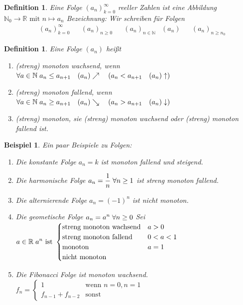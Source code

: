 \documentclass[a4paper,titlepage,oneside]{article}
\def\N{\ensuremath{\mathbb{N}} }
\def\R{\ensuremath{\mathbb{R}} }
\def\fa{\ensuremath{\forall}}
\def\sp{\hspace{0,1cm}}
\theoremstyle{thmstyle}
\newtheorem{defi}[satz]{Definition}
\newtheorem{bsp}[satz]{Beispiel}
\theoremstyle{subthmstyle}
\begin{document}
\begin{defi}
Eine Folge $(a_n)_{k=0}^{\infty}$ reeller Zahlen ist eine Abbildung $\N_0 \rightarrow \R\text{ mit } n \mapsto a_n$
Bezeichnung: Wir schreiben für Folgen
\begin{align*}
&(a_n)_{k=0}^{\infty} && (a_n)_{n\ge0} && (a_n)_{n\in\N} & (a_n) && (a_n)_{n\ge n_0}
\end{align*}
\end{defi}


\begin{defi}
Eine Folge \((a_n)\) heißt
\begin{enumerate}
\item (streng) monoton wachsend, wenn \( \fa a \in \N \sp a_n \le a_{n+1}	\quad (a_n)\nearrow	\quad (a_n < a_{n+1} \quad (a_n)\uparrow)\)
\item (streng) monoton fallend, wenn \( \fa a \in \N \sp a_n \ge a_{n+1}	\quad (a_n)\searrow	\quad (a_n > a_{n+1} \quad (a_n)\downarrow)\)
\item (streng) monoton, sie (streng) monoton wachsend oder (streng) monoton fallend ist.
\end{enumerate}
\end{defi}

\begin{bsp}
Ein paar Beispiele zu Folgen:
\begin{enumerate}[label=(\arabic*)]
\item Die konstante Folge \(a_n = k\) ist monoton fallend und steigend.
\item Die harmonische Folge $ \displaystyle a_n = \frac{1}{n} \sp \fa n \ge 1$ ist streng monoton fallend.
\item Die alternierende Folge $ \displaystyle a_n = (-1)^n $ ist nicht monoton.
\item Die geometische Folge $ \displaystyle  a_n = a^n \sp \fa n \ge 0 $ Sei $ \displaystyle a \in \R \sp a^n \text{ ist }
				\begin{cases}			\text{streng monoton wachsend} 	& a > 0\\
									\text{streng monoton fallend} 		& 0 < a < 1\\
									\text{monoton} 					& a = 1\\
									\text{nicht monoton} 				&  \end{cases} $
\item Die Fibonacci Folge ist monoton wachsend. $ \displaystyle f_n = \begin{cases}	1				& \text{wenn } n = 0, n = 1\\
																f_{n-1} + f_{n-2}	& \text{sonst} \end{cases} $
\end{enumerate}
\end{bsp}
\end{document}
